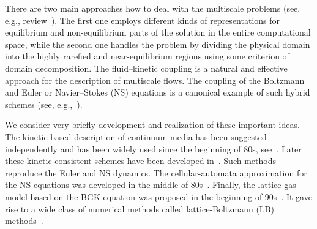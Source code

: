 \documentclass[]{elsarticle} %
\begin{document}
There are two main approaches how to deal with the multiscale problems (see, e.g., review~\cite{Dimarco2014}).
The first one employs different kinds of representations for equilibrium and non-equilibrium parts of the solution
in the entire computational space, while the second one handles the problem by dividing the physical domain
into the highly rarefied and near-equilibrium regions using some criterion of domain decomposition.
The fluid--kinetic coupling is a natural and effective approach for the description of multiscale flows.
The coupling of the Boltzmann and Euler or Navier--Stokes (NS) equations
is a canonical example of such hybrid schemes (see, e.g.,~\cite{Bourgat1996, Tallec1997}).

We consider very briefly development and realization of these important ideas.
The kinetic-based description of continuum media has been suggested independently and has been widely used since the beginning of 80s,
see~\cite{Potkin1975, Pullin1980, Reitz1981, Aristov1983}. Later these kinetic-consistent schemes have been developed
in~\cite{Elizarova1985, Deshpande1986, Prendergast1993, Chou1997, Ohwada2004Xu, Ohwada2004Kobayashi, Ohwada2006}.
Such methods reproduce the Euler and NS dynamics.
The cellular-automata approximation for the NS equations was developed in the middle of 80s~\cite{Frisch1986}.
Finally, the lattice-gas model based on the BGK equation was proposed in the beginning of 90s~\cite{Qian1992}.
It gave rise to a wide class of numerical methods called lattice-Boltzmann (LB) methods~\cite{Higuera1989,Benzi1992,Succi2001}.
\end{document}
